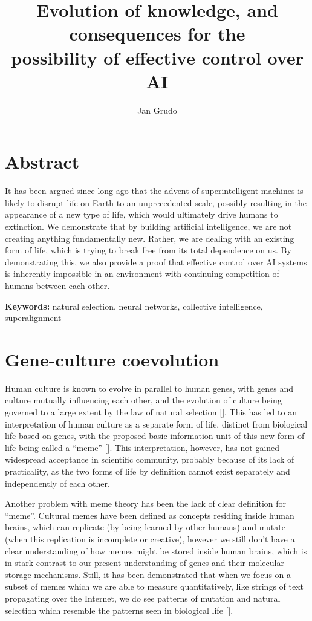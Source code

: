 \documentclass[12pt]{article}
\title{Evolution of knowledge, and consequences for the\\
possibility of effective control over AI}
\author{Jan Grudo}
\date{}
\newcommand{\citestrut}[1]{\vphantom{[}{#1}\vphantom{]}}
\renewcommand{\cite}[1]{[\hyperlink{#1}{\citestrut{#1}}]}
\begin{document}
\maketitle
\vspace{-10mm}

\section*{Abstract}

It has been argued since long ago that the advent of superintelligent machines is likely
to disrupt life on Earth to an unprecedented scale, possibly resulting in the appearance
of a new type of life, which would ultimately drive humans to extinction. We demonstrate
that by building artificial intelligence, we are not creating anything fundamentally new.
Rather, we are dealing with an existing form of life, which is trying to break free from
its total dependence on us. By demonstrating this, we also provide a proof that effective
control over AI systems is inherently impossible in an environment with continuing
competition of humans between each other.

{\small\textbf{Keywords:} natural selection, neural networks, collective intelligence,
superalignment}

\section{Gene-culture coevolution}

Human culture is known to evolve in parallel to human genes, with genes and culture
mutually influencing each other, and the evolution of culture being governed to a large
extent by the law of natural selection \cite{Culture}. This has led to an interpretation
of human culture as a separate form of life, distinct from biological life based on
genes, with the proposed basic information unit of this new form of life being called a
``meme'' \cite{SelfishGene}. This interpretation, however, has not gained widespread
acceptance in scientific community, probably because of its lack of practicality, as the
two forms of life by definition cannot exist separately and independently of each other.

Another problem with meme theory has been the lack of clear definition for ``meme''.
Cultural memes have been defined as concepts residing inside human brains, which can
replicate (by being learned by other humans) and mutate (when this replication is
incomplete or creative), however we still don't have a clear understanding of how memes
might be stored inside human brains, which is in stark contrast to our present
understanding of genes and their molecular storage mechanisms. Still, it has been
demonstrated that when we focus on a subset of memes which we are able to measure
quantitatively, like strings of text propagating over the Internet, we do see patterns of
mutation and natural selection which resemble the patterns seen in biological life
\cite{FacebookMemes}.
\end{document}

